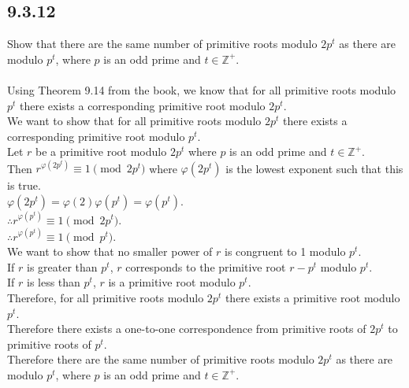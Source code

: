 \documentclass{article}
\begin{document}
\subsection{9.3.12}
Show that there are the same number of primitive roots modulo $2p^t$ as there are modulo $p^t$, where $p$ is an odd prime and $t \in \mathbb{Z}^+$.
\\
\\Using Theorem 9.14 from the book, we know that for all primitive roots modulo $p^t$ there exists a corresponding primitive root modulo $2p^t$.
\\We want to show that for all primitive roots modulo $2p^t$ there exists a corresponding primitive root modulo $p^t$.
\\Let $r$ be a primitive root modulo $2p^t$ where $p$ is an odd prime and $t \in \mathbb{Z}^+$.
\\Then $r^{\varphi(2p^t)} \equiv 1 \pmod{2p^t}$ where $\varphi(2p^t)$ is the lowest exponent such that this is true.
\\$\varphi(2p^t) = \varphi(2)\varphi(p^t) = \varphi(p^t)$.
\\$\therefore r^{\varphi(p^t)} \equiv 1 \pmod{2p^t}$.
\\$\therefore r^{\varphi(p^t)} \equiv 1 \pmod{p^t}$.
\\We want to show that no smaller power of $r$ is congruent to 1 modulo $p^t$.
\\If $r$ is greater than $p^t$, $r$ corresponds to the primitive root $r-p^t$ modulo $p^t$.
\\If $r$ is less than $p^t$, $r$ is a primitive root modulo $p^t$.
\\Therefore, for all primitive roots modulo $2p^t$ there exists a primitive root modulo $p^t$.
\\Therefore there exists a one-to-one correspondence from primitive roots of $2p^t$ to primitive roots of $p^t$.
\\Therefore there are the same number of primitive roots modulo $2p^t$ as there are modulo $p^t$, where $p$ is an odd prime and $t \in \mathbb{Z}^+$.
\end{document}
